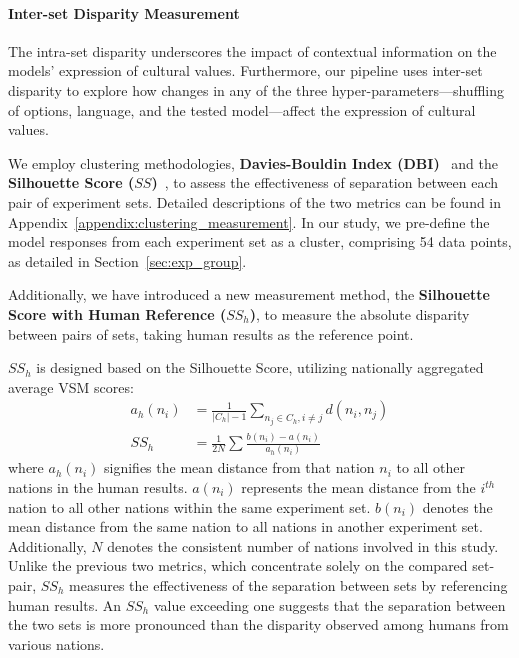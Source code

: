 \documentclass[11pt]{article}
\begin{document}
\paragraph{Inter-set Disparity Measurement}
\label{sec:inter_set_method}

The intra-set disparity underscores the impact of contextual information on the models' expression of cultural values. Furthermore, our pipeline uses inter-set disparity to explore how changes in any of the three hyper-parameters—shuffling of options, language, and the tested model—affect the expression of cultural values.

We employ clustering methodologies, \textbf{Davies-Bouldin Index (DBI)}~\cite{4766909} and the \textbf{Silhouette Score ($SS$)}~\cite{ROUSSEEUW198753}, to assess the effectiveness of separation between each pair of experiment sets. Detailed descriptions of the two metrics can be found in Appendix~\ref{appendix:clustering_measurement}. In our study, we pre-define the model responses from each experiment set as a cluster, comprising 54 data points, as detailed in Section~\ref{sec:exp_group}.

Additionally, we have introduced a new measurement method, the \textbf{Silhouette Score with Human Reference ($SS_h$)}, to measure the absolute disparity between pairs of sets, taking human results as the reference point.

$SS_h$ is designed based on the Silhouette Score, utilizing nationally aggregated average VSM scores:
\begin{align}
    a_h(n_i)& = \frac{1}{| C_h | -1} \sum_{n_j \in C_h ,i \neq j} d(n_i, n_j) \\
    SS_h &= \frac{1}{2N} \sum  \frac{b(n_i) - a(n_i)}{a_h(n_i)}
\end{align}
where \(a_h(n_i)\) signifies the mean distance from that nation \(n_i\) to all other nations in the human results. \(a(n_i)\) represents the mean distance from the \(i^{th}\) nation to all other nations within the same experiment set. \(b(n_i)\) denotes the mean distance from the same nation to all nations in another experiment set. Additionally, \(N\) denotes the consistent number of nations involved in this study.
Unlike the previous two metrics, which concentrate solely on the compared set-pair, \(SS_h\) measures the effectiveness of the separation between sets by referencing human results. An $SS_h$ value exceeding one suggests that the separation between the two sets is more pronounced than the disparity observed among humans from various nations.
\end{document}
